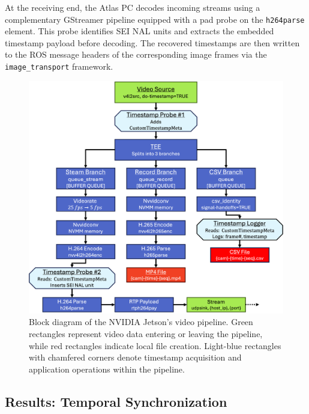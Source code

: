 \documentclass{erauthesis}
\begin{document}
At the receiving end, the Atlas PC decodes incoming streams using a complementary GStreamer pipeline equipped with a pad probe on the \texttt{h264parse} element. This probe identifies SEI NAL units and extracts the embedded timestamp payload before decoding. The recovered timestamps are then written to the ROS message headers of the corresponding image frames via the \texttt{image\_transport} framework.


\begin{figure}[htbp]
\centering
\includegraphics[width=5in]{Images/gstreamer_block.png}
\caption{Block diagram of the NVIDIA Jetson's video pipeline. Green rectangles represent video data entering or leaving the pipeline, while red rectangles indicate local file creation. Light-blue rectangles with chamfered corners denote timestamp acquisition and application operations within the pipeline.}
\label{video_pipeline}
\end{figure}
\subsection{Results: Temporal Synchronization} \label{results)time_sync_cam}
\end{document}
